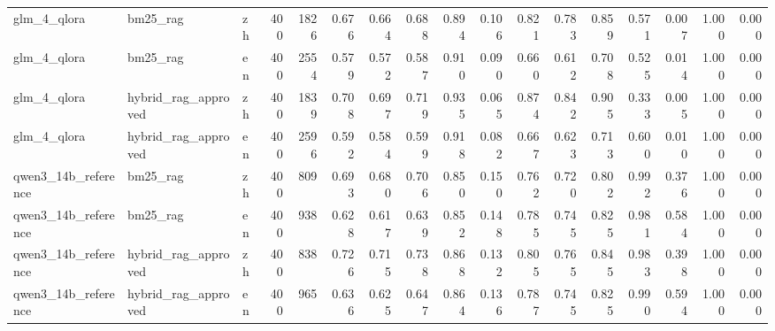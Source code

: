 \begin{tabular}{lllrrrrrrrrrrrrrr}
glm\_4\_qlora & bm25\_rag & zh & 400 & 1826 & 0.676 & 0.664 & 0.688 & 0.894 & 0.106 & 0.821 & 0.783 & 0.859 & 0.571 & 0.007 & 1.000 & 0.000 \\
glm\_4\_qlora & bm25\_rag & en & 400 & 2554 & 0.579 & 0.572 & 0.587 & 0.910 & 0.090 & 0.660 & 0.612 & 0.708 & 0.525 & 0.014 & 1.000 & 0.000 \\
glm\_4\_qlora & hybrid\_rag\_approved & zh & 400 & 1839 & 0.708 & 0.697 & 0.719 & 0.935 & 0.065 & 0.874 & 0.842 & 0.905 & 0.333 & 0.005 & 1.000 & 0.000 \\
glm\_4\_qlora & hybrid\_rag\_approved & en & 400 & 2596 & 0.592 & 0.584 & 0.599 & 0.918 & 0.082 & 0.667 & 0.623 & 0.713 & 0.600 & 0.010 & 1.000 & 0.000 \\
qwen3\_14b\_reference & bm25\_rag & zh & 400 & 809 & 0.693 & 0.680 & 0.706 & 0.850 & 0.150 & 0.762 & 0.720 & 0.802 & 0.992 & 0.376 & 1.000 & 0.000 \\
qwen3\_14b\_reference & bm25\_rag & en & 400 & 938 & 0.628 & 0.617 & 0.639 & 0.852 & 0.148 & 0.785 & 0.745 & 0.825 & 0.981 & 0.584 & 1.000 & 0.000 \\
qwen3\_14b\_reference & hybrid\_rag\_approved & zh & 400 & 838 & 0.726 & 0.715 & 0.738 & 0.868 & 0.132 & 0.805 & 0.765 & 0.845 & 0.983 & 0.398 & 1.000 & 0.000 \\
qwen3\_14b\_reference & hybrid\_rag\_approved & en & 400 & 965 & 0.636 & 0.625 & 0.647 & 0.864 & 0.136 & 0.787 & 0.745 & 0.825 & 0.990 & 0.594 & 1.000 & 0.000 \\
\bottomrule
\end{tabular}
